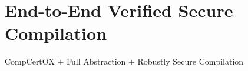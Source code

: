 \section{End-to-End Verified Secure Compilation}

CompCertOX + Full Abstraction + Robustly Secure Compilation
    
